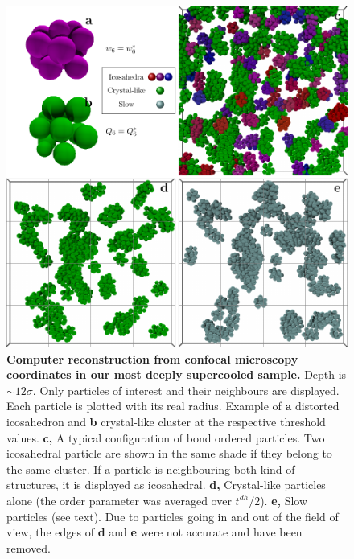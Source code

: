 \begin{figure}
\begin{center}
\includegraphics{generate_figures-figure3.pdf}
\end{center}
\caption{\textbf{Computer reconstruction from confocal microscopy coordinates in our most deeply supercooled sample.} Depth is $\sim 12\sigma$. Only particles of interest and their neighbours are displayed. Each particle is plotted with its real radius.  Example of \textbf{a} distorted icosahedron and \textbf{b} crystal-like cluster at the respective threshold values. \textbf{c,} A typical configuration of bond ordered particles. Two icosahedral particle are shown in the same shade if they belong to the same cluster. If a particle is neighbouring both kind of structures, it is displayed as icosahedral. \textbf{d,} Crystal-like particles alone (the order parameter was averaged over $t^{dh}/2$). \textbf{e,} Slow particles (see text). Due to particles going in and out of the field of view, the edges of \textbf{d} and \textbf{e} were not accurate and have been removed.}
	\label{fig:3D}
\end{figure}
\clearpage


